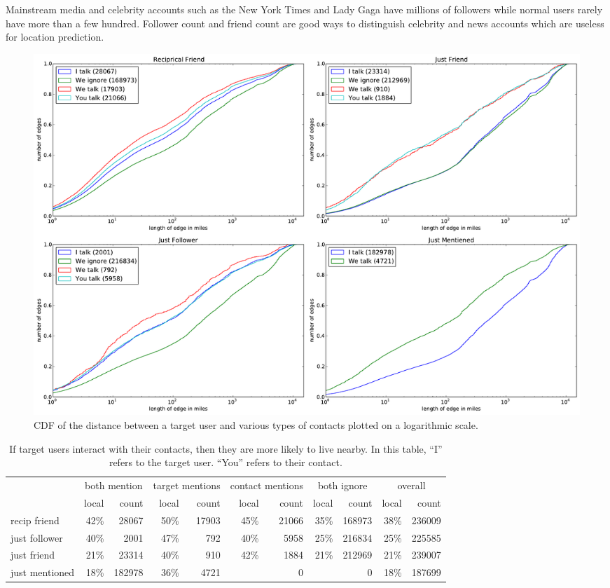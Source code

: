 \documentclass[letterpaper]{article}
\begin{document}
Mainstream media and celebrity accounts such as the New York Times and Lady
Gaga have millions of followers while normal users rarely have more than a few
hundred.
%
Follower count and friend count are good ways to distinguish celebrity and news
accounts which are useless for location prediction.

\ifdefined\THESIS
    \begin{figure}[tbh]
    \centering
    \includegraphics[width=\linewidth]{figures/com_types.pdf}
    \caption{
    CDF of the distance between a target user and various types of contacts
    plotted on a logarithmic scale.
    }
    \label{fig:ComTypes}
    \end{figure}
\fi


\begin{table}[tbh]
\scriptsize
\centering
\begin{tabular}{l | r r | r r | r r | r r | r r}
    & \multicolumn{2}{c}{both mention}
    & \multicolumn{2}{|c}{target mentions}
    & \multicolumn{2}{|c}{contact mentions}
    & \multicolumn{2}{|c}{both ignore}
    & \multicolumn{2}{|c}{overall} \\
    \cline{2-11}
    &local&count&local&count&local&count&local&count&local&count \\
    \hline
    recip friend & 42\%&28067 & 50\%&17903 & 45\%&21066 & 35\%&168973 & 38\%&236009 \\
    just follower & 40\%&2001 & 47\%&792 & 40\%&5958 & 25\%&216834 & 25\%&225585 \\
    just friend & 21\%&23314 & 40\%&910 & 42\%&1884 & 21\%&212969 & 21\%&239007 \\
    just mentioned & 18\%&182978 & 36\%&4721 & & 0 & & 0 & 18\%&187699 \\
\end{tabular}
\caption{
If target users interact with their contacts, then they are more likely to
live nearby.
%
In this table, ``I'' refers to the target user. ``You'' refers to their
contact.
%
}
\label{tab:ComTypes}
\end{table}
\end{document}
